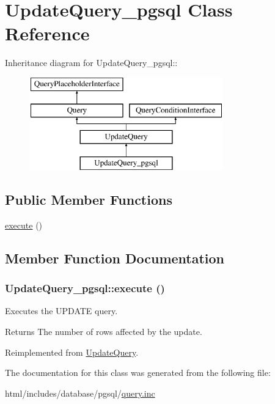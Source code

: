 \hypertarget{classUpdateQuery__pgsql}{
\section{UpdateQuery\_\-pgsql Class Reference}
\label{classUpdateQuery__pgsql}
}
Inheritance diagram for UpdateQuery\_\-pgsql::\begin{figure}[H]
\begin{center}
\leavevmode
\includegraphics[height=4cm]{classUpdateQuery__pgsql}
\end{center}
\end{figure}
\subsection*{Public Member Functions}
\begin{DoxyCompactItemize}
\item 
\hyperlink{classUpdateQuery__pgsql_a1c8ce7ceb61c265cc8b9cfce4afb7648}{execute} ()
\end{DoxyCompactItemize}


\subsection{Member Function Documentation}
\hypertarget{classUpdateQuery__pgsql_a1c8ce7ceb61c265cc8b9cfce4afb7648}{
\subsubsection[{execute}]{\setlength{\rightskip}{0pt plus 5cm}UpdateQuery\_\-pgsql::execute ()}}
\label{classUpdateQuery__pgsql_a1c8ce7ceb61c265cc8b9cfce4afb7648}
Executes the UPDATE query.

\begin{DoxyReturn}{Returns}
The number of rows affected by the update. 
\end{DoxyReturn}


Reimplemented from \hyperlink{classUpdateQuery_a8a90104d1f7aa75cda332b569fd566b9}{UpdateQuery}.

The documentation for this class was generated from the following file:\begin{DoxyCompactItemize}
\item 
html/includes/database/pgsql/\hyperlink{pgsql_2query_8inc}{query.inc}\end{DoxyCompactItemize}
